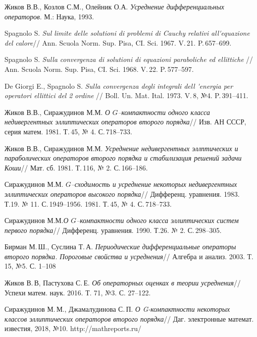 \begin{thebibliography}{111}


Жиков В.В., Козлов С.М., Олейник О.А. \emph{Усреднение дифференциальных
операторов}. М.: Наука, 1993.

Spagnolo S. \emph{Sul limite delle solutioni di problemi di Cauchy
relativi all\'{}equazione del calore}// Ann. Scuola Norm. Sup. Pisa, CI. Sci. 1967. V.\,21.
P.\,657--699.

Spagnolo S. \emph{Sulla convergenza di solutioni di equazioni paraboliche ed ellittiche
} // Ann. Scuola Norm. Sup. Pisa, CI. Sci. 1968. V.\,22.
P.\,577--597.

De Giorgi E., Spagnolo S. \emph{Sulla convergenza degli integrali dell \'{}energia
per operatori ellittici del 2 ordine} // Boll. Un. Mat. Ital. 1973. V.\,8, №4. P.\,391--411.

Жиков В.В., Сиражудинов М.М. \emph{О $G$--компактности одного класса недивергентных
эллиптических операторов второго порядка}// Изв. АН СССР, серия матем.
1981. Т.\,45, № 4. С.\,718--733.

Жиков В.В., Сиражудинов М.М. \emph{Усреднение недивергентных эллптических и
параболических операторов второго порядка и стабилизация решений задачи Коши}//
Мат. сб. 1981. Т.\,116, № 2. С.\,166--186.

Сиражудинов М.М. \emph{$G$--сходимость и усреднение некоторых недивергентных
эллиптических операторов высокого порядка}// Дифференц. уравнения. 1983.
Т.19. № 11. С.\,1949--1956.
1981. Т.\,45, № 4. С.\,718--733.

Сиражудинов М.М.\emph{О $G$--компактности одного класса эллиптических систем первого
порядка}// Дифференц. уравнения. 1990. Т.26. № 2. С.\,298--305.

  Бирман М.\,Ш.,  Суслина Т.\,А.
\emph{Периодические дифференциальные операторы второго порядка.
Пороговые свойства и усреднения}//
Алгебра и анализ. 2003. Т. 15, №5. С. 1--108


  Жиков В.\,В,  Пастухова С.\,Е.
 \emph{Об операторных оценках в теории усреднения}//
Успехи матем. наук. 2016. Т. 71, №3. С. 27--122.


Сиражудинов М.\,М., Джамалудинова С.\,П. \emph{О G-компактности некоторых классов эллиптических операторов второго порядка}// Даг. электронные математ. известия, 2018, №10.  http://mathreports.ru/


\end{thebibliography}
